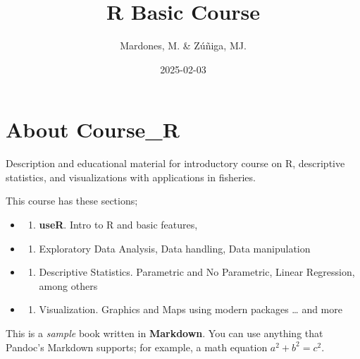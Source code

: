 \documentclass[
]{book}
\title{R Basic Course}
\author{Mardones, M. \& Zúñiga, MJ.}
\date{2025-02-03}
\providecommand{\tightlist}{%
  \setlength{\itemsep}{0pt}\setlength{\parskip}{0pt}}
\begin{document}
\maketitle

{
\hypersetup{linkcolor=}
\setcounter{tocdepth}{1}
\tableofcontents
}
\hypertarget{about-course_r}{%
\chapter*{About Course\_R}\label{about-course_r}}

Description and educational material for introductory course on R, descriptive statistics, and visualizations with applications in fisheries.

This course has these sections;

\begin{itemize}
\item
  \begin{enumerate}
  \def\labelenumi{\arabic{enumi}.}
  \tightlist
  \item
    \textbf{useR}. Intro to R and basic features,
  \end{enumerate}
\item
  \begin{enumerate}
  \def\labelenumi{\arabic{enumi}.}
  \setcounter{enumi}{1}
  \tightlist
  \item
    Exploratory Data Analysis, Data handling, Data manipulation
  \end{enumerate}
\item
  \begin{enumerate}
  \def\labelenumi{\arabic{enumi}.}
  \setcounter{enumi}{2}
  \tightlist
  \item
    Descriptive Statistics. Parametric and No Parametric, Linear Regression, among others
  \end{enumerate}
\item
  \begin{enumerate}
  \def\labelenumi{\arabic{enumi}.}
  \setcounter{enumi}{3}
  \tightlist
  \item
    Visualization. Graphics and Maps using modern packages
    \ldots{} and more
  \end{enumerate}
\end{itemize}

This is a \emph{sample} book written in \textbf{Markdown}. You can use anything that Pandoc's Markdown supports; for example, a math equation \(a^2 + b^2 = c^2\).
\end{document}
